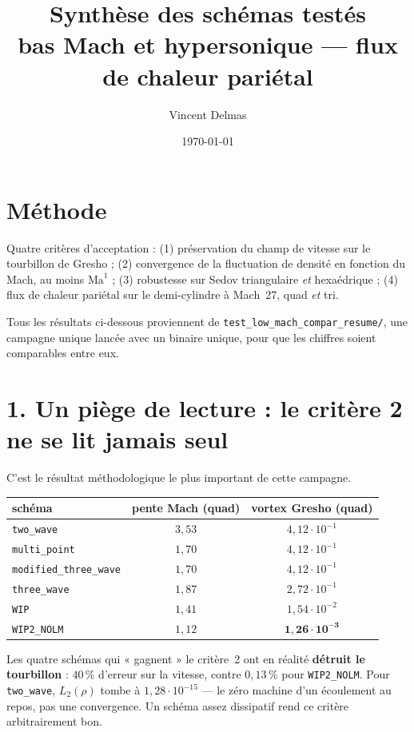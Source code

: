 \documentclass[11pt,a4paper]{article}
\title{Synthèse des schémas testés\\\large bas Mach et hypersonique --- flux de chaleur pariétal}
\author{Vincent Delmas}
\date{\today}
\begin{document}
\maketitle

\section*{Méthode}

Quatre critères d'acceptation : (1) préservation du champ de vitesse sur le tourbillon
de Gresho ; (2) convergence de la fluctuation de densité en fonction du Mach, au moins
$\mathrm{Ma}^1$ ; (3) robustesse sur Sedov triangulaire \emph{et} hexaédrique ;
(4) flux de chaleur pariétal sur le demi-cylindre à Mach~27, quad \emph{et} tri.

Tous les résultats ci-dessous proviennent de \texttt{test\_low\_mach\_compar\_resume/},
une campagne unique lancée avec un binaire unique, pour que les chiffres soient
comparables entre eux.

\section*{1. Un piège de lecture : le critère 2 ne se lit jamais seul}

C'est le résultat méthodologique le plus important de cette campagne.

\begin{table}[h]\centering
\begin{tabular}{lcc}
\toprule
schéma & pente Mach (quad) & vortex Gresho (quad) \\
\midrule
\texttt{two\_wave}            & $3{,}53$ & $4{,}12\cdot10^{-1}$ \\
\texttt{multi\_point}         & $1{,}70$ & $4{,}12\cdot10^{-1}$ \\
\texttt{modified\_three\_wave}& $1{,}70$ & $4{,}12\cdot10^{-1}$ \\
\texttt{three\_wave}          & $1{,}87$ & $2{,}72\cdot10^{-1}$ \\
\texttt{WIP}                  & $1{,}41$ & $1{,}54\cdot10^{-2}$ \\
\texttt{WIP2\_NOLM}           & $1{,}12$ & $\mathbf{1{,}26\cdot10^{-3}}$ \\
\bottomrule
\end{tabular}
\end{table}

Les quatre schémas qui « gagnent » le critère~2 ont en réalité \textbf{détruit le
tourbillon} : $40\,\%$ d'erreur sur la vitesse, contre $0{,}13\,\%$ pour
\texttt{WIP2\_NOLM}. Pour \texttt{two\_wave}, $L_2(\rho)$ tombe à
$1{,}28\cdot10^{-15}$ --- le zéro machine d'un écoulement au repos, pas une
convergence. Un schéma assez dissipatif rend ce critère arbitrairement bon.
\end{document}
